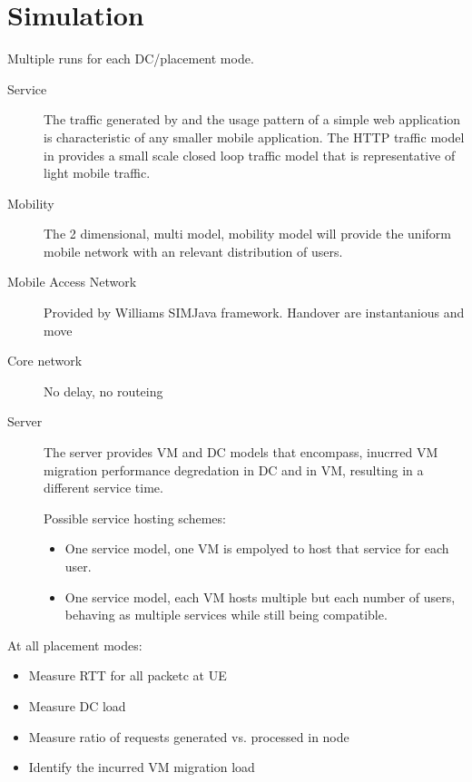 \section{Simulation}

Multiple runs for each DC/\xcloud placement mode.
\begin{description}
\item[Service]
The traffic generated by and the usage pattern of a simple web application is characteristic of any smaller mobile application. The HTTP traffic model in \cite{liu2001traffic} provides a small scale closed loop traffic model that is representative of light mobile traffic.

\item[Mobility]
The 2 dimensional, multi model, mobility model \cite{bettstetter2001smooth} will provide the uniform mobile network with an relevant distribution of users.

\item[Mobile Access Network] Provided by Williams SIMJava framework. Handover are instantanious and move 

\item[Core network] No delay, no routeing

\item[Server] The server provides VM and DC models that encompass, inucrred VM migration performance degredation in DC and in VM, resulting in a different service time.

Possible service hosting schemes:
\begin{itemize}
\item One service model, one VM is empolyed to host that service for each user.
\item One service model, each VM hosts multiple but each number of users, behaving as multiple services while still being compatible.
\end{itemize}

\end{description}

At all placement modes:
\begin{itemize}
\item Measure RTT for all packetc at UE
\item Measure DC load
\item Measure ratio of requests generated vs. processed in \xcloud node
\item Identify the incurred VM migration load
\end{itemize}